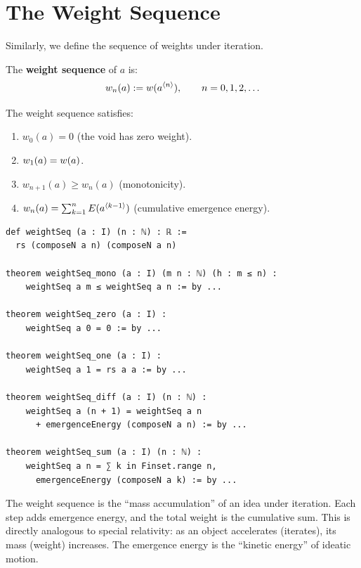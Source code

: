 \section{The Weight Sequence}

Similarly, we define the sequence of weights under iteration.

\begin{definition}
\label{def:weight-seq}
The \textbf{weight sequence} of $a$ is:
\[
  w_n(a) := w(a^{\langle n \rangle}), \qquad n = 0, 1, 2, \ldots
\]
\end{definition}

\begin{theorem}
\label{thm:weight-seq-properties}
The weight sequence satisfies:
\begin{enumerate}
  \item $w_0(a) = 0$ (the void has zero weight).
  \item $w_1(a) = w(a)$.
  \item $w_{n+1}(a) \geq w_n(a)$ (monotonicity).
  \item $w_n(a) = \sum_{k=1}^{n} E(a^{\langle k-1 \rangle})$ (cumulative emergence energy).
\end{enumerate}
\end{theorem}

\begin{lstlisting}[caption={Weight sequence (IDT\_v3\_Emergence.lean)}]
def weightSeq (a : I) (n : ℕ) : ℝ :=
  rs (composeN a n) (composeN a n)

theorem weightSeq_mono (a : I) (m n : ℕ) (h : m ≤ n) :
    weightSeq a m ≤ weightSeq a n := by ...

theorem weightSeq_zero (a : I) :
    weightSeq a 0 = 0 := by ...

theorem weightSeq_one (a : I) :
    weightSeq a 1 = rs a a := by ...

theorem weightSeq_diff (a : I) (n : ℕ) :
    weightSeq a (n + 1) = weightSeq a n
      + emergenceEnergy (composeN a n) := by ...

theorem weightSeq_sum (a : I) (n : ℕ) :
    weightSeq a n = ∑ k in Finset.range n,
      emergenceEnergy (composeN a k) := by ...
\end{lstlisting}

\begin{interpretation}
The weight sequence is the ``mass accumulation'' of an idea under iteration.
Each step adds emergence energy, and the total weight is the cumulative sum.
This is directly analogous to special relativity: as an object accelerates
(iterates), its mass (weight) increases. The emergence energy is the ``kinetic
energy'' of ideatic motion.
\end{interpretation}


